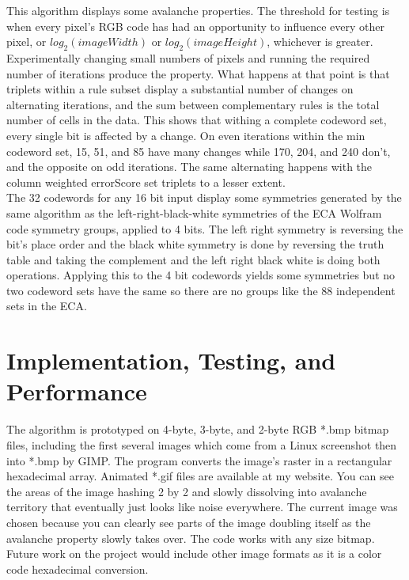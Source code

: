 \documentclass[11pt]{article}
\begin{document}
This algorithm displays some avalanche properties. The threshold for testing is when every pixel's RGB code has had an opportunity to influence every other pixel, or $log_2(imageWidth)$ or $log_2(imageHeight)$, whichever is greater. Experimentally changing small numbers of pixels and running the required number of iterations produce the property. What happens at that point is that triplets within a rule subset display a substantial number of changes on alternating iterations, and the sum between complementary rules is the total number of cells in the data. This shows that withing a complete codeword set, every single bit is affected by a change. On even iterations within the min codeword set, 15, 51, and 85 have many changes while 170, 204, and 240 don't, and the opposite on odd iterations. The same alternating happens with the column weighted errorScore set triplets to a lesser extent.\\

The 32 codewords for any 16 bit input display some symmetries generated by the same algorithm as the left-right-black-white symmetries of the ECA Wolfram code symmetry groups, applied to 4 bits. The left right symmetry is reversing the bit's place order and the black white symmetry is done by reversing the truth table and taking the complement and the left right black white is doing both operations. Applying this to the 4 bit codewords yields some symmetries but no two codeword sets have the same so there are no groups like the 88 independent sets in the ECA.\cite{Wolfram}\\

\section{Implementation, Testing, and Performance}

The algorithm is prototyped on 4-byte, 3-byte, and 2-byte RGB *.bmp bitmap files, including the first several images which come from a Linux screenshot then into *.bmp by GIMP. The program converts the image's raster in a rectangular hexadecimal array. Animated *.gif files are available at my website. You can see the areas of the image hashing 2 by 2 and slowly dissolving into avalanche territory that eventually just looks like noise everywhere. The current image was chosen because you can clearly see parts of the image doubling itself as the avalanche property slowly takes over. The code works with any size bitmap. Future work on the project would include other image formats as it is a color code hexadecimal conversion. \\
\end{document}
